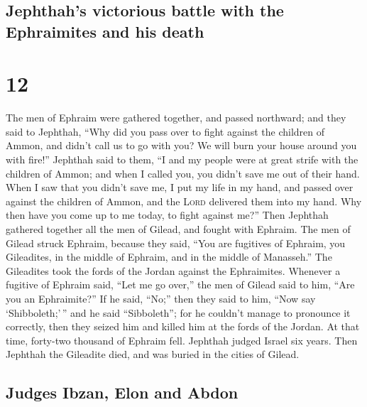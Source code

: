 \hypertarget{jephthahs-victorious-battle-with-the-ephraimites-and-his-death}{%
\subsection{Jephthah's victorious battle with the Ephraimites and his
death}\label{jephthahs-victorious-battle-with-the-ephraimites-and-his-death}}

\hypertarget{section-11}{%
\section{12}\label{section-11}}

 The men of Ephraim were gathered together, and passed
northward; and they said to Jephthah, ``Why did you pass over to fight
against the children of Ammon, and didn't call us to go with you? We
will burn your house around you with fire!''  Jephthah
said to them, ``I and my people were at great strife with the children
of Ammon; and when I called you, you didn't save me out of their hand.
 When I saw that you didn't save me, I put my life in my
hand, and passed over against the children of Ammon, and the
\textsc{Lord} delivered them into my hand. Why then have you come up to
me today, to fight against me?''  Then Jephthah gathered
together all the men of Gilead, and fought with Ephraim. The men of
Gilead struck Ephraim, because they said, ``You are fugitives of
Ephraim, you Gileadites, in the middle of Ephraim, and in the middle of
Manasseh.''  The Gileadites took the fords of the Jordan
against the Ephraimites. Whenever a fugitive of Ephraim said, ``Let me
go over,'' the men of Gilead said to him, ``Are you an Ephraimite?'' If
he said, ``No;''  then they said to him, ``Now say
`Shibboleth;'\,'' and he said ``Sibboleth''; for he couldn't manage to
pronounce it correctly, then they seized him and killed him at the fords
of the Jordan. At that time, forty-two thousand of Ephraim fell.
 Jephthah judged Israel six years. Then Jephthah the
Gileadite died, and was buried in the cities of Gilead.

\hypertarget{judges-ibzan-elon-and-abdon}{%
\subsection{Judges Ibzan, Elon and
Abdon}\label{judges-ibzan-elon-and-abdon}}

